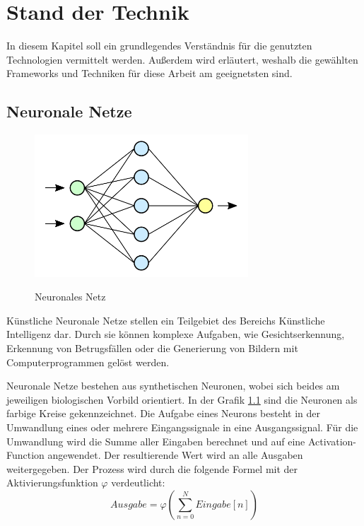 
\chapter{Stand der Technik}
In diesem Kapitel soll ein grundlegendes Verständnis für die genutzten Technologien vermittelt werden.
Außerdem wird erläutert, weshalb die gewählten Frameworks und Techniken für diese Arbeit am geeignetsten sind.

\section{Neuronale Netze}

\begin{figure}[H]
	\centering
	\includegraphics[width=8cm]{kapitel/2_stand_der_technik/img/neural_networks.png}
	\label{img:neural-networks}
	\caption{Neuronales Netz \cite{img:neural-networks}}
\end{figure}

Künstliche Neuronale Netze stellen ein Teilgebiet des Bereichs Künstliche Intelligenz dar.
Durch sie können komplexe Aufgaben, wie Gesichtserkennung, Erkennung von Betrugsfällen oder die Generierung von Bildern mit Computerprogrammen gelöst werden.
\newline

Neuronale Netze bestehen aus synthetischen Neuronen, wobei sich beides am jeweiligen biologischen Vorbild orientiert.
In der Grafik \cref{img:neural-networks} sind die Neuronen als farbige Kreise gekennzeichnet.
Die Aufgabe eines Neurons besteht in der Umwandlung eines oder mehrere Eingangssignale in eine Ausgangssignal.
Für die Umwandlung wird die Summe aller Eingaben berechnet und auf eine Activation-Function angewendet.
Der resultierende Wert wird an alle Ausgaben weitergegeben.
Der Prozess wird durch die folgende Formel mit der Aktivierungsfunktion $\varphi$ verdeutlicht:
\[ Ausgabe = \varphi ( \sum_{n=0}^N Eingabe[n] )\]

